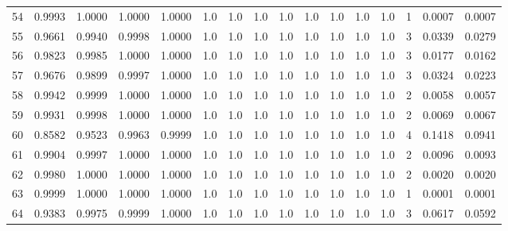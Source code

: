 \begin{tabular}{lrrrrrrrrrrrrrrr}
54  &      0.9993 &  1.0000 &  1.0000 &  1.0000 &     1.0 &     1.0 &     1.0 &     1.0 &     1.0 &     1.0 &      1.0 &        1.0 &      1 &                    0.0007 &                     0.0007 \\
55  &      0.9661 &  0.9940 &  0.9998 &  1.0000 &     1.0 &     1.0 &     1.0 &     1.0 &     1.0 &     1.0 &      1.0 &        1.0 &      3 &                    0.0339 &                     0.0279 \\
56  &      0.9823 &  0.9985 &  1.0000 &  1.0000 &     1.0 &     1.0 &     1.0 &     1.0 &     1.0 &     1.0 &      1.0 &        1.0 &      3 &                    0.0177 &                     0.0162 \\
57  &      0.9676 &  0.9899 &  0.9997 &  1.0000 &     1.0 &     1.0 &     1.0 &     1.0 &     1.0 &     1.0 &      1.0 &        1.0 &      3 &                    0.0324 &                     0.0223 \\
58  &      0.9942 &  0.9999 &  1.0000 &  1.0000 &     1.0 &     1.0 &     1.0 &     1.0 &     1.0 &     1.0 &      1.0 &        1.0 &      2 &                    0.0058 &                     0.0057 \\
59  &      0.9931 &  0.9998 &  1.0000 &  1.0000 &     1.0 &     1.0 &     1.0 &     1.0 &     1.0 &     1.0 &      1.0 &        1.0 &      2 &                    0.0069 &                     0.0067 \\
60  &      0.8582 &  0.9523 &  0.9963 &  0.9999 &     1.0 &     1.0 &     1.0 &     1.0 &     1.0 &     1.0 &      1.0 &        1.0 &      4 &                    0.1418 &                     0.0941 \\
61  &      0.9904 &  0.9997 &  1.0000 &  1.0000 &     1.0 &     1.0 &     1.0 &     1.0 &     1.0 &     1.0 &      1.0 &        1.0 &      2 &                    0.0096 &                     0.0093 \\
62  &      0.9980 &  1.0000 &  1.0000 &  1.0000 &     1.0 &     1.0 &     1.0 &     1.0 &     1.0 &     1.0 &      1.0 &        1.0 &      2 &                    0.0020 &                     0.0020 \\
63  &      0.9999 &  1.0000 &  1.0000 &  1.0000 &     1.0 &     1.0 &     1.0 &     1.0 &     1.0 &     1.0 &      1.0 &        1.0 &      1 &                    0.0001 &                     0.0001 \\
64  &      0.9383 &  0.9975 &  0.9999 &  1.0000 &     1.0 &     1.0 &     1.0 &     1.0 &     1.0 &     1.0 &      1.0 &        1.0 &      3 &                    0.0617 &                     0.0592 \\

\end{tabular}
